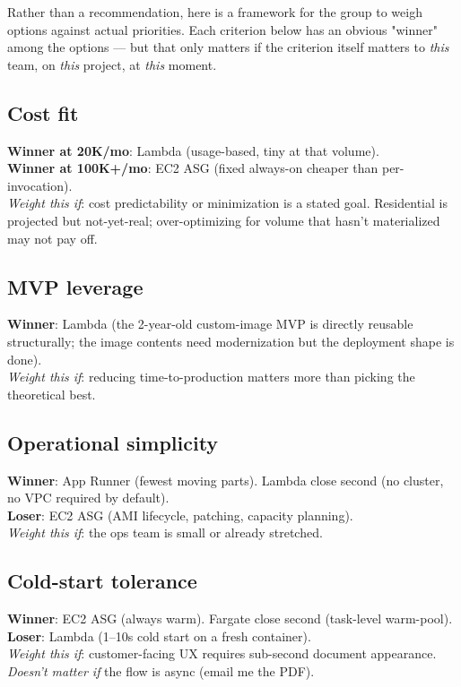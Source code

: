 \documentclass[11pt,letterpaper]{article}
\begin{document}
Rather than a recommendation, here is a framework for the group to weigh options against actual priorities. Each criterion below has an obvious "winner" among the options --- but that only matters if the criterion itself matters to \emph{this} team, on \emph{this} project, at \emph{this} moment.

\subsection{Cost fit}
\textbf{Winner at 20K/mo}: Lambda (usage-based, tiny at that volume).\\
\textbf{Winner at 100K+/mo}: EC2 ASG (fixed always-on cheaper than per-invocation).\\
\emph{Weight this if}: cost predictability or minimization is a stated goal. Residential is projected but not-yet-real; over-optimizing for volume that hasn't materialized may not pay off.

\subsection{MVP leverage}
\textbf{Winner}: Lambda (the 2-year-old custom-image MVP is directly reusable structurally; the image contents need modernization but the deployment shape is done).\\
\emph{Weight this if}: reducing time-to-production matters more than picking the theoretical best.

\subsection{Operational simplicity}
\textbf{Winner}: App Runner (fewest moving parts). Lambda close second (no cluster, no VPC required by default).\\
\textbf{Loser}: EC2 ASG (AMI lifecycle, patching, capacity planning).\\
\emph{Weight this if}: the ops team is small or already stretched.

\subsection{Cold-start tolerance}
\textbf{Winner}: EC2 ASG (always warm). Fargate close second (task-level warm-pool).\\
\textbf{Loser}: Lambda (1--10s cold start on a fresh container).\\
\emph{Weight this if}: customer-facing UX requires sub-second document appearance. \emph{Doesn't matter if} the flow is async (email me the PDF).
\end{document}
